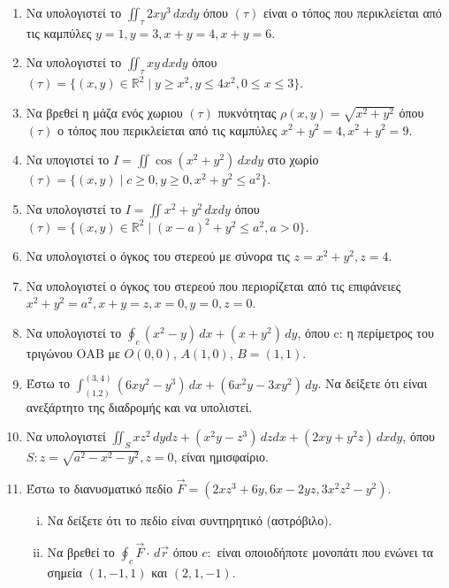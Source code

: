 






\begin{center}
\end{center} 

\vspace{\baselineskip} 



\begin{enumerate}
  \item Να υπολογιστεί το $\iint_{\tau}2xy^3\,dxdy$ όπου $(\tau)$ είναι ο τόπος 
    που περικλείεται από τις καμπύλες $y=1, y=3, x+y=4, x+y=6$.

  \item Να υπολογιστεί το $\iint_{\tau}xy\,dxdy$ όπου 
    $(\tau)=\{(x,y)\in \mathbb{R}^2 \mid y\geq x^2, y\leq 4x^2, 0\leq x\leq 3\}$.

  \item Να βρεθεί η μάζα ενός χωριου $(\tau)$ πυκνότητας $\rho(x,y)=\sqrt{x^2+y^2}$ 
    όπου $(\tau)$ ο τόπος που περικλείεται από τις καμπύλες $x^2+y^2=4, x^2+y^2=9$.

  \item Να υπογιστεί το $I=\iint\cos (x^2+y^2)\,dxdy$ στο χωρίο 
    $(\tau)=\{(x,y) \mid c\geq 0, y\geq 0, x^2+y^2\leq a^2\}$.

  \item Να υπολογιστεί το $I=\iint x^2+y^2\,dxdy$ όπου 
    $(\tau)=\{(x,y)\in \mathbb{R}^2 \mid (x-a)^2+y^2\leq a^2, a>0\}$.

  \item Να υπολογιστεί ο όγκος του στερεού με σύνορα τις $z=x^2+y^2, z=4$.

  \item Να υπολογιστεί ο όγκος του στερεού που περιορίζεται από τις επιφάνειες 
    $x^2+y^2=a^2, x+y=z, x=0, y=0, z=0$. 

  \item Να υπολογιστεί το $\oint_c(x^2-y)\,dx+(x+y^2)\,dy$, όπου c: η 
    περίμετρος του τριγώνου ΟΑΒ με $O(0,0)$, $A(1,0)$, $B=(1,1)$.

  \item Έστω το $\int_{(1.2)}^{(3,4)}(6xy^2-y^3)\,dx + (6x^2y-3xy^2)\,dy$. 
    Να δείξετε ότι είναι ανεξάρτητο της διαδρομής και να υπολιστεί.

  \item Να υπολογιστεί $\iint_S xz^2\,dydz+(x^2y-z^3)\,dzdx+(2xy+y^2z)\,dxdy$, 
    όπου $S: z=\sqrt{a^2-x^2-y^2}, z=0$, είναι ημισφαίριο.

  \item Έστω το διανυσματικό πεδίο $\vec{F}=(2xz^3+6y,6x-2yz,3x^2z^2-y^2)$.
    \begin{enumerate}[i)]
      \item Να δείξετε ότι το πεδίο είναι συντηρητικό (αστρόβιλο).
      \item Να βρεθεί το $\oint_c \vec{F}\cdot\,d\vec{r}$ όπου $c:$ είναι 
        οποιοδήποτε μονοπάτι που ενώνει τα σημεία $(1,-1,1)$ και $(2,1,-1)$.
    \end{enumerate}
\end{enumerate}


